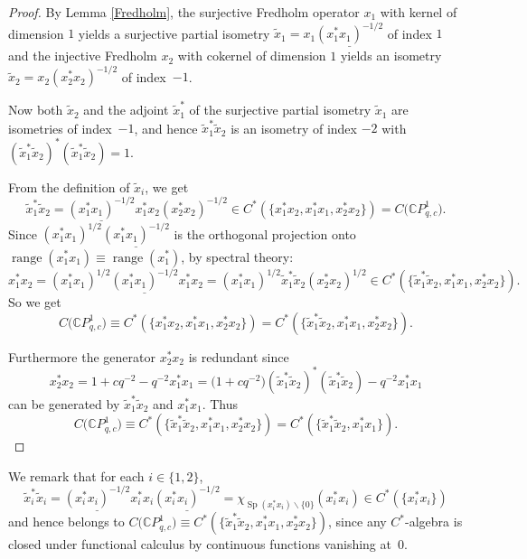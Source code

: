 \begin{proof} By Lemma \ref{Fredholm}, the surjective Fredholm operator $x_{1}$ with kernel of
dimension $1$ yields a surjective partial isometry $\tilde{x}_{1}%
=x_{1}\underline{( x_{1}^{\ast}x_{1}) ^{-1/2}}$ of index $1$ and
the injective Fredholm $x_{2}$ with cokernel of dimension $1$ yields an
isometry $\tilde{x}_{2}=x_{2}( x_{2}^{\ast}x_{2}) ^{-1/2}$ of
index~$-1$.

Now both $\tilde{x}_{2}$ and the adjoint $\tilde{x}_{1}^{\ast}$ of the
surjective partial isometry $\tilde{x}_{1}$ are isometries of index~$-1$, and
hence $\tilde{x}_{1}^{\ast}\tilde{x}_{2}$ is an isometry of index $-2$ with
$( \tilde{x}_{1}^{\ast}\tilde{x}_{2}) ^{\ast}( \tilde
{x}_{1}^{\ast}\tilde{x}_{2}) =1$.

From the definition of $\tilde{x}_{i}$, we get
\[
\tilde{x}_{1}^{\ast}\tilde{x}_{2}=\underline{( x_{1}^{\ast}x_{1})
^{-1/2}}x_{1}^{\ast}x_{2}( x_{2}^{\ast}x_{2}) ^{-1/2}\in C^{\ast
}( \{ x_{1}^{\ast}x_{2},x_{1}^{\ast}x_{1},x_{2}^{\ast}%
x_{2}\}) =C\big(\mathbb{C}P_{q,c}^{1}\big) .
\]
Since $( x_{1}^{\ast}x_{1}) ^{1/2}\underline{(
x_{1}^{\ast}x_{1}) ^{-1/2}}$ is the orthogonal projection onto
$\operatorname{range}( x_{1}^{\ast}x_{1}) \equiv
\operatorname{range}( x_{1}^{\ast}) $, by spectral theory:
\[
x_{1}^{\ast}x_{2}=( x_{1}^{\ast}x_{1}) ^{1/2}\underline{(
x_{1}^{\ast}x_{1}) ^{-1/2}}x_{1}^{\ast}x_{2}=( x_{1}^{\ast}%
x_{1}) ^{1/2}\tilde{x}_{1}^{\ast}\tilde{x}_{2}( x_{2}^{\ast}%
x_{2}) ^{1/2}\in C^{\ast}( \{ \tilde{x}_{1}^{\ast}\tilde
{x}_{2},x_{1}^{\ast}x_{1},x_{2}^{\ast}x_{2}\}) .
\]
So we get
\[
C\big(\mathbb{C}P_{q,c}^{1}\big) \equiv C^{\ast}(\{
x_{1}^{\ast}x_{2},x_{1}^{\ast}x_{1},x_{2}^{\ast}x_{2}\})
=C^{\ast}(\{ \tilde{x}_{1}^{\ast}\tilde{x}_{2},x_{1}^{\ast}%
x_{1},x_{2}^{\ast}x_{2}\} ) .
\]


Furthermore the generator $x_{2}^{\ast}x_{2}$ is redundant since%
\[
x_{2}^{\ast}x_{2}=1+cq^{-2}-q^{-2}x_{1}^{\ast}x_{1}=\big( 1+cq^{-2}\big)
 ( \tilde{x}_{1}^{\ast}\tilde{x}_{2} ) ^{\ast} ( \tilde{x}%
_{1}^{\ast}\tilde{x}_{2} ) -q^{-2}x_{1}^{\ast}x_{1}
\]
can be generated by $\tilde{x}_{1}^{\ast}\tilde{x}_{2}$ and $x_{1}^{\ast}%
x_{1}$. Thus
\[
C\big(\mathbb{C}P_{q,c}^{1}\big) \equiv C^{\ast} ( \{
\tilde{x}_{1}^{\ast}\tilde{x}_{2},x_{1}^{\ast}x_{1},x_{2}^{\ast}x_{2} \}
 ) =C^{\ast} ( \{ \tilde{x}_{1}^{\ast}\tilde{x}_{2},x_{1}^{\ast}x_{1} \} ) .\tag*{\qed}
\]
\renewcommand{\qed}{}
\end{proof}


We remark that for each $i\in \{ 1,2 \} $,
\[
\tilde{x}_{i}^{\ast}\tilde{x}_{i}=\underline{( x_{i}^{\ast}x_{i})
^{-1/2}}x_{i}^{\ast}x_{i}\underline{( x_{i}^{\ast}x_{i}) ^{-1/2}%
}=\chi_{\operatorname{Sp}( x_{i}^{\ast}x_{i}) \backslash\{
0\} }( x_{i}^{\ast}x_{i}) \in C^{\ast}( \{
x_{i}^{\ast}x_{i}\} )
\]
and hence belongs to $C\big(\mathbb{C}P_{q,c}^{1}\big) \equiv C^{\ast
} ( \{ \tilde{x}_{1}^{\ast}\tilde{x}_{2},x_{1}^{\ast}x_{1}%
,x_{2}^{\ast}x_{2} \} ) $, since any $C^*$-algebra is closed under
functional calculus by continuous functions vanishing at~$0$.


